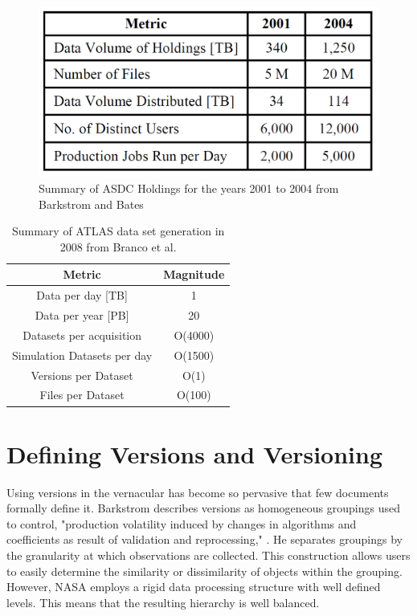 \begin{figure}
	\centering
	\includegraphics[scale=0.40]{figures/ASDCHoldings.png}
	\caption{Summary of ASDC Holdings for the years 2001 to 2004 from Barkstrom and Bates \cite{Barkstrom_digitallibrary}}
	\label{table:ASDC}
\end{figure}

\begin{table}
	\centering
	\begin{tabular}{ | c | c |}
		\hline
		Metric & Magnitude \\
		\hline
		Data per day [TB] & 1 \\
		Data per year [PB] & 20 \\
		Datasets per acquisition & O(4000) \\
		Simulation Datasets per day & O(1500) \\
		Versions per Dataset & O(1) \\
		Files per Dataset & O(100) \\
		\hline
	\end{tabular}
	\caption{Summary of ATLAS data set generation in 2008 from Branco et al.\cite{Branco2008}}
	\label{table:Atlas}
\end{table}

\section{Defining Versions and Versioning}

Using versions in the vernacular has become so pervasive that few documents formally define it.
Barkstrom describes versions as homogeneous groupings used to control, "production volatility induced by changes in algorithms and coefficients as result of validation and reprocessing," \cite{Barkstrom2003}.
He separates groupings by the granularity at which observations are collected.  This construction allows users to easily determine the similarity or dissimilarity of objects within the grouping.  However, NASA employs a rigid data processing structure with well defined levels.  This means that the resulting hierarchy is well balanced.

